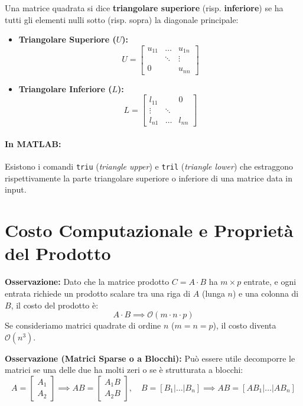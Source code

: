 \documentclass[a4paper,12pt]{article}
\begin{document}
	\begin{tcolorbox}[title=Definizione (Matrice Triangolare)]
		Una matrice quadrata si dice \textbf{triangolare superiore} (risp. \textbf{inferiore}) se ha tutti gli elementi nulli sotto (risp. sopra) la diagonale principale:
		\begin{itemize}
			\item \textbf{Triangolare Superiore ($U$):}
			\[
			U = \begin{bmatrix} 
				u_{11} & \dots & u_{1n} \\ 
				& \ddots & \vdots \\ 
				0 & & u_{nn} 
			\end{bmatrix}
			\]
			\item \textbf{Triangolare Inferiore ($L$):}
			\[
			L = \begin{bmatrix} 
				l_{11} & & 0 \\ 
				\vdots & \ddots & \\ 
				l_{n1} & \dots & l_{nn} 
			\end{bmatrix}
			\]
		\end{itemize}
	\end{tcolorbox}
	
	\paragraph{In MATLAB:} Esistono i comandi \texttt{triu} (\textit{triangle upper}) e \texttt{tril} (\textit{triangle lower}) che estraggono rispettivamente la parte triangolare superiore o inferiore di una matrice data in input.
	\section*{Costo Computazionale e Proprietà del Prodotto}
	
	\textbf{Osservazione:} Dato che la matrice prodotto $C = A \cdot B$ ha $m \times p$ entrate, e ogni entrata richiede un prodotto scalare tra una riga di $A$ (lunga $n$) e una colonna di $B$, il costo del prodotto è:
	\[
	A \cdot B \implies \mathcal{O}(m \cdot n \cdot p)
	\]
	Se consideriamo matrici quadrate di ordine $n$ ($m=n=p$), il costo diventa $\mathcal{O}(n^3)$.
	
	\textbf{Osservazione (Matrici Sparse o a Blocchi):} Può essere utile decomporre le matrici se una delle due ha molti zeri o se è strutturata a blocchi:
	\[
	A = \begin{bmatrix} A_1 \\ \hline A_2 \end{bmatrix} \implies AB = \begin{bmatrix} A_1 B \\ \hline A_2 B \end{bmatrix}, \quad B = [B_1 | \dots | B_n] \implies AB = [AB_1 | \dots | AB_n]
	\]
	
\end{document}
